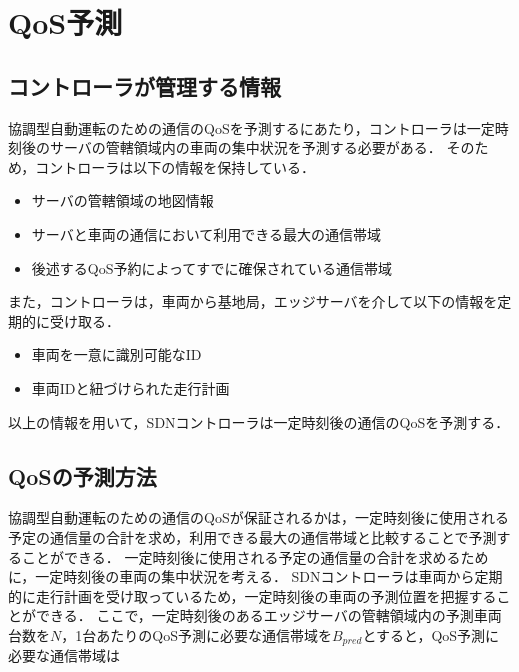 \documentclass[a4paper,11pt,uplatex]{ujreport}
\begin{document}

\section{QoS予測}
\label{sec:QoS予測}

\subsection{コントローラが管理する情報}

協調型自動運転のための通信のQoSを予測するにあたり，コントローラは一定時刻後のサーバの管轄領域内の車両の集中状況を予測する必要がある．
そのため，コントローラは以下の情報を保持している．

\begin{itemize}
\item サーバの管轄領域の地図情報
\item サーバと車両の通信において利用できる最大の通信帯域
\item 後述するQoS予約によってすでに確保されている通信帯域
\end{itemize}

また，コントローラは，車両から基地局，エッジサーバを介して以下の情報を定期的に受け取る．

\begin{itemize}
\item 車両を一意に識別可能なID
\item 車両IDと紐づけられた走行計画
\end{itemize}

以上の情報を用いて，SDNコントローラは一定時刻後の通信のQoSを予測する．

\subsection{QoSの予測方法}

協調型自動運転のための通信のQoSが保証されるかは，一定時刻後に使用される予定の通信量の合計を求め，利用できる最大の通信帯域と比較することで予測することができる．
一定時刻後に使用される予定の通信量の合計を求めるために，一定時刻後の車両の集中状況を考える．
SDNコントローラは車両から定期的に走行計画を受け取っているため，一定時刻後の車両の予測位置を把握することができる．
ここで，一定時刻後のあるエッジサーバの管轄領域内の予測車両台数を$N$，1台あたりのQoS予測に必要な通信帯域を$B_{pred}$とすると，QoS予測に必要な通信帯域は
\end{document}
